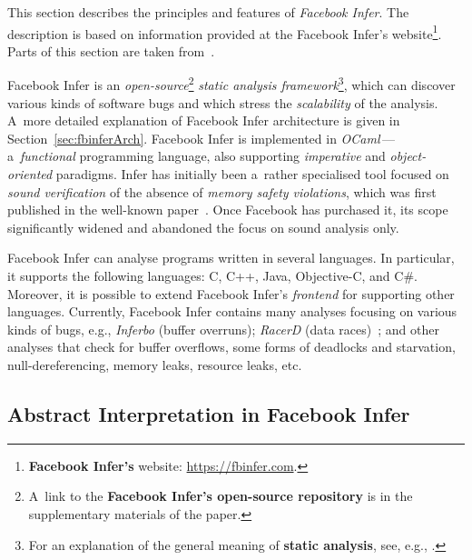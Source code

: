 \documentclass{ExcelAtFIT}
\theoremstyle{definition}
\begin{document}
This section describes the principles and features of \emph{Facebook Infer}. The description is based on information provided at the Facebook Infer's website\footnote{\textbf{Facebook Infer's} website: \url{https://fbinfer.com}.}. Parts of this section are taken from~\cite{harmimBP}.

Facebook Infer is an \emph{open-source}\footnote{A~link to the \textbf{Facebook Infer's open-source repository} is in the supplementary materials of the paper.} \emph{static analysis framework}\footnote{For an explanation of the general meaning of \textbf{static analysis}, see, e.g., \cite{staticAnalysisMoller, programAnalysisNielson, staticAnalysisRival}.}, which can discover various kinds of software bugs and which stress the \emph{scalability} of the analysis. A~more detailed explanation of Facebook Infer architecture is given in Section~\ref{sec:fbinferArch}. Facebook Infer is implemented in \emph{OCaml}\,---\,a~\emph{functional} programming language, also supporting \emph{imperative} and \emph{object-oriented} paradigms. Infer has initially been a~rather specialised tool focused on \emph{sound verification} of the absence of \emph{memory safety violations}, which was first published in the well-known paper~\cite{inferBiabduction}. Once Facebook has purchased it, its scope significantly widened and abandoned the focus on sound analysis only.

Facebook Infer can analyse programs written in several languages. In particular, it supports the following languages: C, C++, Java, Objective-C, and C\#. Moreover, it is possible to extend Facebook Infer's \emph{frontend} for supporting other languages. Currently, Facebook Infer contains many analyses focusing on various kinds of bugs, e.g., \emph{Inferbo} (buffer overruns); \emph{RacerD} (data races)~\cite{racerD}; and other analyses that check for buffer overflows, some forms of deadlocks and starvation, null-dereferencing, memory leaks, resource leaks, etc.

\subsection{Abstract Interpretation in Facebook Infer}
\end{document}
